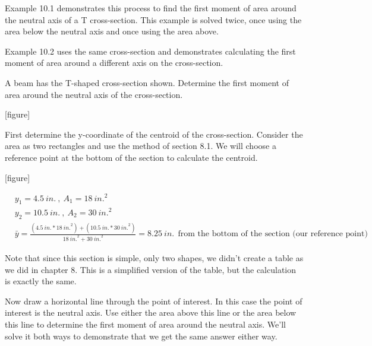 \documentclass[
  letterpaper,
  DIV=11,
  numbers=noendperiod]{scrreprt}
\begin{document}
Example 10.1 demonstrates this process to find the first moment of area
around the neutral axis of a T cross-section. This example is solved
twice, once using the area below the neutral axis and once using the
area above.

Example 10.2 uses the same cross-section and demonstrates calculating
the first moment of area around a different axis on the cross-section.

\begin{tcolorbox}[enhanced jigsaw, breakable, opacityback=0, toptitle=1mm, left=2mm, colback=white, opacitybacktitle=0.6, colframe=quarto-callout-tip-color-frame, titlerule=0mm, arc=.35mm, leftrule=.75mm, bottomtitle=1mm, colbacktitle=quarto-callout-tip-color!10!white, rightrule=.15mm, title={Example 10.1}, bottomrule=.15mm, toprule=.15mm, coltitle=black]

A beam has the T-shaped cross-section shown. Determine the first moment
of area around the neutral axis of the cross-section.

{[}figure{]}

\begin{tcolorbox}[enhanced jigsaw, breakable, opacityback=0, toptitle=1mm, left=2mm, colback=white, opacitybacktitle=0.6, colframe=quarto-callout-note-color-frame, titlerule=0mm, arc=.35mm, leftrule=.75mm, bottomtitle=1mm, colbacktitle=quarto-callout-note-color!10!white, rightrule=.15mm, title={Solution}, bottomrule=.15mm, toprule=.15mm, coltitle=black]

First determine the y-coordinate of the centroid of the cross-section.
Consider the area as two rectangles and use the method of section 8.1.
We will choose a reference point at the bottom of the section to
calculate the centroid.

{[}figure{]}

\[
\begin{aligned}
& y_1=4.5{~in.}~,~ A_1=18{~in.}^2 \\
& y_2=10.5{~in.}~,~ A_2=30{~in.}^2 \\
& \bar{y}=\frac{(4.5{~in.} * 18{~in.}^2)+(10.5{~in.} * 30{~in.}^2)}{18{~in.}^2+30{~in.}^2}=8.25{~in.}~~\text{from the bottom of the section (our reference point) }
\end{aligned}
\]

Note that since this section is simple, only two shapes, we didn't
create a table as we did in chapter 8. This is a simplified version of
the table, but the calculation is exactly the same.

Now draw a horizontal line through the point of interest. In this case
the point of interest is the neutral axis. Use either the area above
this line or the area below this line to determine the first moment of
area around the neutral axis. We'll solve it both ways to demonstrate
that we get the same answer either way.


\end{tcolorbox}
\end{tcolorbox}
\end{document}
